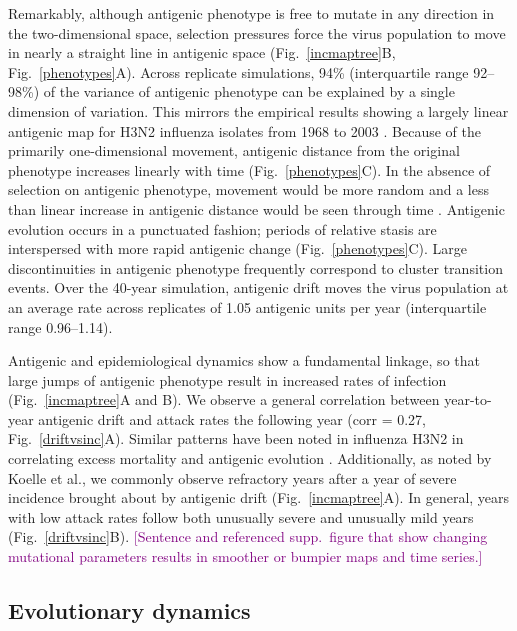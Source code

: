 \documentclass[11pt,oneside,letterpaper]{article}
\def\tbc#1{\textcolor{purple}{[#1]}}
\begin{document}
Remarkably, although antigenic phenotype is free to mutate in any direction in the two-dimensional space, selection pressures force the virus population to move in nearly a straight line in antigenic space (Fig.~\ref{incmaptree}B, Fig.~\ref{phenotypes}A).  Across replicate simulations, 94\% (interquartile range 92--98\%) of the variance of antigenic phenotype can be explained by a single dimension of variation.  This mirrors the empirical results showing a largely linear antigenic map for H3N2 influenza isolates from 1968 to 2003 \cite{Smith04}.  Because of the primarily one-dimensional movement, antigenic distance from the original phenotype increases linearly with time (Fig.~\ref{phenotypes}C).  In the absence of selection on antigenic phenotype, movement would be more random and a less than linear increase in antigenic distance would be seen through time \cite{Bedford09}.  Antigenic evolution occurs in a punctuated fashion; periods of relative stasis are interspersed with more rapid antigenic change (Fig.~\ref{phenotypes}C).  Large discontinuities in antigenic phenotype frequently correspond to cluster transition events.  Over the  40-year simulation, antigenic drift moves the virus population at an average rate across replicates of 1.05 antigenic units per year (interquartile range 0.96--1.14). 

Antigenic and epidemiological dynamics show a fundamental linkage, so that large jumps of antigenic phenotype result in increased rates of infection (Fig.~\ref{incmaptree}A and B).  We observe a general correlation between year-to-year antigenic drift and attack rates the following year (corr = 0.27, Fig.~\ref{driftvsinc}A).  Similar patterns have been noted in influenza H3N2 in correlating excess mortality and antigenic evolution \cite{Wu10}.  Additionally, as noted by Koelle et al.\cite{Koelle06}, we commonly observe refractory years after a year of severe incidence brought about by antigenic drift (Fig.~\ref{incmaptree}A).  In general, years with low attack rates follow both unusually severe and unusually mild years (Fig.~\ref{driftvsinc}B).  \tbc{Sentence and referenced supp.\ figure that show changing mutational parameters results in smoother or bumpier maps and time series.}

\subsection*{Evolutionary dynamics}
\end{document}
